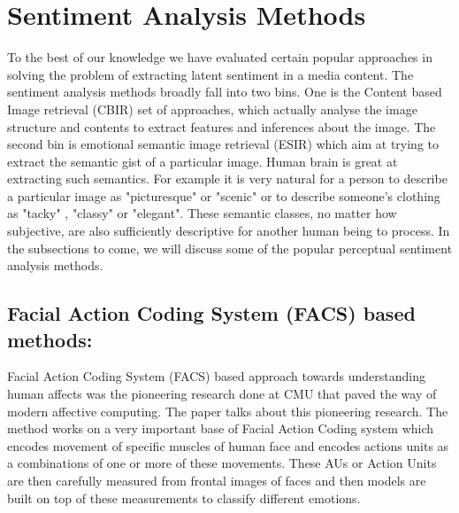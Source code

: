\section{ Sentiment Analysis Methods }
To the best of our knowledge we have evaluated certain popular approaches in solving the problem of extracting latent sentiment in a media content. The sentiment analysis methods broadly fall into two bins. One is the Content based Image retrieval (CBIR) \cite{CBIRSurvey} set of approaches, which actually analyse the image structure and contents to extract features and inferences about the image. The second bin is emotional semantic image retrieval (ESIR) \cite{ESIRSurvey} which aim at trying to extract the semantic gist of a particular image. Human brain is great at extracting such semantics. For example it is very natural for a person to describe a particular image as "picturesque" or "scenic" or to describe someone's clothing as "tacky" , "classy" or "elegant". These semantic classes, no matter how subjective, are also sufficiently descriptive for another human being to process. 
In the subsections to come, we will discuss some of the popular perceptual sentiment analysis methods.


\subsection{Facial Action Coding System (FACS) based methods:}
Facial Action Coding System (FACS) based approach towards understanding human affects was the pioneering research done at CMU that paved the way of modern affective computing. The paper \cite{670980} talks about this pioneering research. The method works on a very important base of Facial Action Coding \cite{FACS} system which encodes movement of specific muscles of human face and encodes actions units as a combinations of one or more of these movements. These AUs or Action Units are then carefully measured from frontal images of faces and then models are built on top of these measurements to classify different emotions.  

